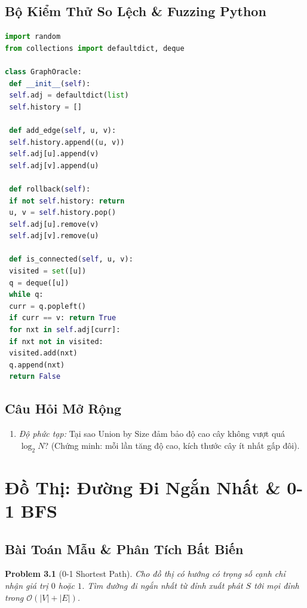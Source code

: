 \documentclass[11pt, letterpaper]{report}
\newtheorem{baitoan}{Problem}[chapter]
\begin{document}
\section{Bộ Kiểm Thử So Lệch \& Fuzzing Python}
\begin{lstlisting}[language=Python, caption={Python Rollback DSU vs Graph BFS Oracle}]
import random
from collections import defaultdict, deque

class GraphOracle:
 def __init__(self):
 self.adj = defaultdict(list)
 self.history = []

 def add_edge(self, u, v):
 self.history.append((u, v))
 self.adj[u].append(v)
 self.adj[v].append(u)

 def rollback(self):
 if not self.history: return
 u, v = self.history.pop()
 self.adj[u].remove(v)
 self.adj[v].remove(u)

 def is_connected(self, u, v):
 visited = set([u])
 q = deque([u])
 while q:
 curr = q.popleft()
 if curr == v: return True
 for nxt in self.adj[curr]:
 if nxt not in visited:
 visited.add(nxt)
 q.append(nxt)
 return False
\end{lstlisting}

\section{Câu Hỏi Mở Rộng}
\begin{enumerate}
 \item \textit{Độ phức tạp:} Tại sao Union by Size đảm bảo độ cao cây không vượt quá $\log_2 N$? (Chứng minh: mỗi lần tăng độ cao, kích thước cây ít nhất gấp đôi).
\end{enumerate}

\chapter{Đồ Thị: Đường Đi Ngắn Nhất \& 0-1 BFS}
\label{mod:graphs}

\section{Bài Toán Mẫu \& Phân Tích Bất Biến}
\begin{baitoan}[0-1 Shortest Path]
Cho đồ thị có hướng có trọng số cạnh chỉ nhận giá trị $0$ hoặc $1$. Tìm đường đi ngắn nhất từ đỉnh xuất phát $S$ tới mọi đỉnh trong $\mathcal{O}(|V| + |E|)$.
\end{baitoan}
\end{document}

